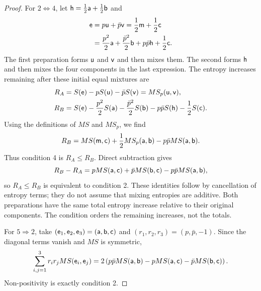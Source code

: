 \begin{proof}
	For $2\Leftrightarrow4$, let $\ens[h]=\frac{1}{2}\ens[a]+\frac{1}{2}\ens[b]$ and
	\begin{equation}
		\begin{aligned}
			\ens[e]&=p\ens[u]+\bar{p}\ens[v]
			=\frac{1}{2}\ens[m]+\frac{1}{2}\ens[c]\\
			&=\frac{p^2}{2}\ens[a]+\frac{\bar{p}^2}{2}\ens[b]+p\bar{p}\ens[h]+\frac{1}{2}\ens[c].
		\end{aligned}
	\end{equation}
	The first preparation forms $\ens[u]$ and $\ens[v]$ and then mixes them. The second forms $\ens[h]$ and then mixes the four components in the last expression. The entropy increases remaining after these initial equal mixtures are
	\begin{equation}
		\begin{aligned}
			R_A&=S(\ens[e])-pS(\ens[u])-\bar{p}S(\ens[v])=MS_p(\ens[u],\ens[v]),\\
			R_B&=S(\ens[e])-\frac{p^2}{2}S(\ens[a])-\frac{\bar{p}^2}{2}S(\ens[b])-p\bar{p}S(\ens[h])-\frac{1}{2}S(\ens[c]).
		\end{aligned}
	\end{equation}
	Using the definitions of $MS$ and $MS_p$, we find
	\begin{equation}
		R_B=MS(\ens[m],\ens[c])+\frac{1}{2}MS_p(\ens[a],\ens[b])-p\bar{p}MS(\ens[a],\ens[b]).
	\end{equation}
	Thus condition 4 is $R_A\leq R_B$. Direct subtraction gives
	\begin{equation}
		R_B-R_A=pMS(\ens[a],\ens[c])+\bar{p}MS(\ens[b],\ens[c])-p\bar{p}MS(\ens[a],\ens[b]),
	\end{equation}
	so $R_A\leq R_B$ is equivalent to condition 2. These identities follow by cancellation of entropy terms; they do not assume that mixing entropies are additive. Both preparations have the same total entropy increase relative to their original components. The condition orders the remaining increases, not the totals.
	
	For $5\Rightarrow2$, take $(\ens_1,\ens_2,\ens_3)=(\ens[a],\ens[b],\ens[c])$ and $(r_1,r_2,r_3)=(p,\bar{p},-1)$. Since the diagonal terms vanish and $MS$ is symmetric,
	\begin{equation}
		\sum_{i,j=1}^3 r_i r_j MS(\ens_i,\ens_j)
		=2\left(p\bar{p}MS(\ens[a],\ens[b])-pMS(\ens[a],\ens[c])-\bar{p}MS(\ens[b],\ens[c])\right).
	\end{equation}
	Non-positivity is exactly condition 2.
	

\end{proof}
